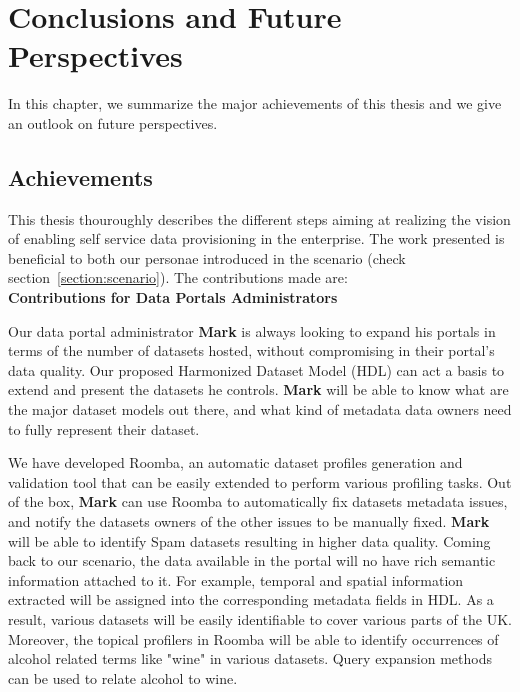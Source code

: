 \chapter{Conclusions and Future Perspectives}  \label{ch:conclusion}
\graphicspath{{conclusions/figures/}}

In this chapter, we summarize the major achievements of this thesis and we give an outlook on future perspectives.

\section{Achievements}

This thesis thouroughly describes the different steps aiming at realizing the vision of enabling self service data provisioning in the enterprise. The work presented is beneficial to both our personae introduced in the scenario (check section~\ref{section:scenario}). The contributions made are:\\

\textbf{Contributions for Data Portals Administrators}
\vspace{1mm}

Our data portal administrator \textbf{Mark} is always looking to expand his portals in terms of the number of datasets hosted, without compromising in their portal's data quality. Our proposed Harmonized Dataset Model (HDL) can act a basis to extend and present the datasets he controls. \textbf{Mark} will be able to know what are the major dataset models out there, and what kind of metadata data owners need to fully represent their dataset.

We have developed Roomba, an automatic dataset profiles generation and validation tool that can be easily extended to perform various profiling tasks. Out of the box, \textbf{Mark} can use Roomba to automatically fix datasets metadata issues, and notify the datasets owners of the other issues to be manually fixed. \textbf{Mark} will be able to identify Spam datasets resulting in higher data quality. Coming back to our scenario, the data available in the portal will no have rich semantic information attached to it. For example, temporal and spatial information extracted will be assigned into the corresponding metadata fields in HDL. As a result, various datasets will be easily identifiable to cover various parts of the UK. Moreover, the topical profilers in Roomba will be able to identify occurrences of alcohol related terms like "wine" in various datasets. Query expansion methods can be used to relate alcohol to wine.\\

